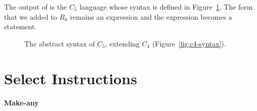 \documentclass[11pt]{book}
\newcommand{\gray}[1]{{\color{gray} #1}}
\begin{document}
The output of  is the $C_5$ language whose
syntax is defined in Figure~\ref{fig:c5-syntax}. The 
form that we added to $R_6$ remains an expression and the 
expression becomes a statement.

\begin{figure}[tp]
\fbox{
\begin{minipage}{0.96\textwidth}
\small
\[
\begin{array}{lcl}
\Exp &::= & \ldots
   \mid \VALUEOF{\Exp}{\FType} \\
\Stmt &::=& \gray{ \ASSIGN{\VAR{\Var}}{\Exp} 
  \mid \LP\key{Collect} \,\itm{int}\RP }
  \mid \LP\key{Exit}\RP \\
\Tail &::= & \gray{ \RETURN{\Exp} \mid \SEQ{\Stmt}{\Tail} 
       \mid \GOTO{\itm{label}} } \\
    &\mid& \gray{ \IFSTMT{\BINOP{\itm{cmp}}{\Atm}{\Atm}}{\GOTO{\itm{label}}}{\GOTO{\itm{label}}}  }\\
    &\mid& \gray{ \TAILCALL{\Atm}{\Atm\ldots} } \\
\Def &::=& \gray{ \DEF{\itm{label}}{\LP[\Var\key{:}\Type]\ldots\RP}{\Type}{\itm{info}}{\LP\LP\itm{label}\,\key{.}\,\Tail\RP\ldots\RP} }\\
C_4 & ::= & \gray{ \PROGRAMDEFS{\itm{info}}{\LP\Def\ldots\RP} }
\end{array}
\]
\end{minipage}
}
\caption{The abstract syntax of $C_5$, extending $C_4$ (Figure~\ref{fig:c4-syntax}).}
\label{fig:c5-syntax}
\end{figure}



\section{Select Instructions}
\label{sec:select-r6}

\paragraph{Make-any}
\end{document}
